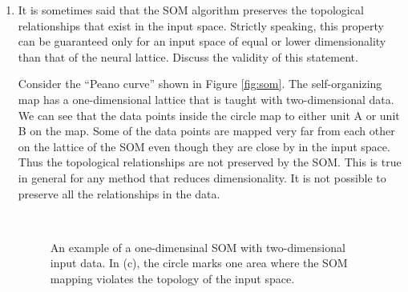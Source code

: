 \begin{enumerate}
  
\item It is sometimes said that the SOM algorithm preserves the
  topological relationships that exist in the input space. Strictly
  speaking, this property can be guaranteed only for an input space of
  equal or lower dimensionality than that of the neural
  lattice. Discuss the validity of this statement.

  \begin{solution}


    Consider the ``Peano curve'' shown in Figure \ref{fig:som}. The
    self-organizing map has a one-dimensional lattice that is taught
    with two-dimensional data. We can see that the data points inside
    the circle map to either unit A or unit B on the map. Some of the
    data points are mapped very far from each other on the lattice of
    the SOM even though they are close by in the input space. Thus the
    topological relationships are not preserved by the SOM. This is
    true in general for any method that reduces dimensionality. It is
    not possible to preserve all the relationships in the data.

    \begin{figure}[h]
      \centering %
      \hfill %
      \\
      \caption{An example of a one-dimensinal SOM with two-dimensional
        input data.  In (c), the circle marks one area where the SOM
        mapping violates the topology of the input space.}
    \end{figure}



\end{solution}
\end{enumerate}
